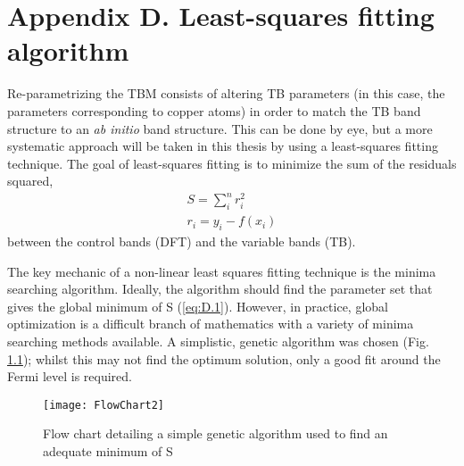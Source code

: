 

\chapter{Appendix D. Least-squares fitting algorithm} %

\label{AppendixD} %


Re-parametrizing the TBM consists of altering TB parameters (in this case, the parameters corresponding to copper atoms) in order to match the TB band structure to an \textit{ab initio} band structure. This can be done by eye, but a more systematic approach will be taken in this thesis by using a least-squares fitting technique. The goal of least-squares fitting is to minimize the sum of the residuals squared,
\begin{align}
S = \sum_i^n r_i^2 \label{eq:D.1} \\
r_i = y_i - f(x_i) \label{eq:D.2}
\end{align}
between the control bands (DFT) and the variable bands (TB). 


The key mechanic of a non-linear least squares fitting technique is the minima searching algorithm. Ideally, the algorithm should find the parameter set that gives the global minimum of S (\ref{eq:D.1}). However, in practice, global optimization is a difficult branch of mathematics with a variety of minima searching methods available. A simplistic, genetic algorithm was chosen (Fig. \ref{msa:figD1}); whilst this may not find the optimum solution, only a good fit around the Fermi level is required. \newpage

\begin{figure}[h]
\centering
\texttt{[image: FlowChart2]}
\caption{Flow chart detailing a simple genetic algorithm used to find an adequate minimum of S}
\label{msa:figD1}
\end{figure}
